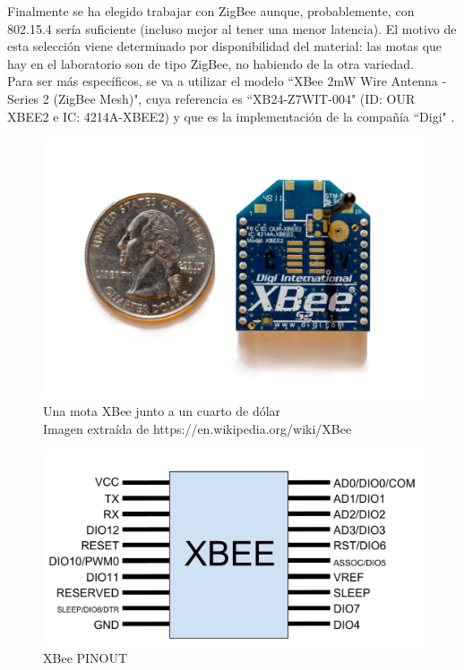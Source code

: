 Finalmente se ha elegido trabajar con ZigBee aunque, probablemente, con 802.15.4 sería suficiente (incluso
mejor al tener una menor latencia). El motivo de esta selección viene determinado por disponibilidad del material:
las motas que hay en el laboratorio son de tipo ZigBee, no habiendo de la otra variedad.\\

Para ser más específicos, se va a utilizar el modelo ``XBee 2mW Wire Antenna - Series 2 (ZigBee Mesh)", cuya referencia es
``XB24-Z7WIT-004" (ID: OUR XBEE2 e IC: 4214A-XBEE2) y que es la implementación de la compañía ``Digi" \cite{productdetaildigi}.\\


\begin{figure}[htb]
\centering
\captionsetup{justification=centering}
\includegraphics[width=1\textwidth]{./imagenes/xbeequarter}
\caption{Una mota XBee junto a un cuarto de dólar\\
\scriptsize{Imagen extraída de https://en.wikipedia.org/wiki/XBee} } \label{fig:xbeequarter}
\end{figure}

\begin{figure}[htb]
\centering
\includegraphics[width=1\textwidth]{./imagenes/xbeepinout}
\caption{XBee PINOUT} \label{fig:xbeepinout}
\end{figure}

